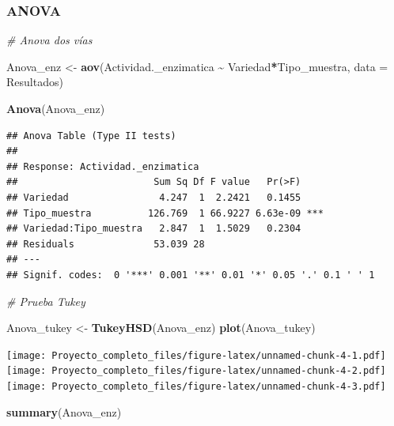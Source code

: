 \documentclass[
]{article}
\newenvironment{Shaded}{\begin{snugshade}}{\end{snugshade}}
\newcommand{\AttributeTok}[1]{\textcolor[rgb]{0.13,0.29,0.53}{#1}}
\newcommand{\CommentTok}[1]{\textcolor[rgb]{0.56,0.35,0.01}{\textit{#1}}}
\newcommand{\FunctionTok}[1]{\textcolor[rgb]{0.13,0.29,0.53}{\textbf{#1}}}
\newcommand{\NormalTok}[1]{#1}
\newcommand{\OtherTok}[1]{\textcolor[rgb]{0.56,0.35,0.01}{#1}}
\newcommand{\SpecialCharTok}[1]{\textcolor[rgb]{0.81,0.36,0.00}{\textbf{#1}}}
\begin{document}
\hypertarget{anova}{%
\subsubsection{\texorpdfstring{\textbf{ANOVA}}{ANOVA}}\label{anova}}

\begin{Shaded}
\begin{Highlighting}[]
\CommentTok{\# Anova dos vías}

\NormalTok{Anova\_enz }\OtherTok{\textless{}{-}} \FunctionTok{aov}\NormalTok{(Actividad.\_enzimatica }\SpecialCharTok{\textasciitilde{}}\NormalTok{ Variedad}\SpecialCharTok{*}\NormalTok{Tipo\_muestra, }\AttributeTok{data =}\NormalTok{ Resultados)}

\FunctionTok{Anova}\NormalTok{(Anova\_enz)}
\end{Highlighting}
\end{Shaded}

\begin{verbatim}
## Anova Table (Type II tests)
## 
## Response: Actividad._enzimatica
##                        Sum Sq Df F value   Pr(>F)    
## Variedad                4.247  1  2.2421   0.1455    
## Tipo_muestra          126.769  1 66.9227 6.63e-09 ***
## Variedad:Tipo_muestra   2.847  1  1.5029   0.2304    
## Residuals              53.039 28                     
## ---
## Signif. codes:  0 '***' 0.001 '**' 0.01 '*' 0.05 '.' 0.1 ' ' 1
\end{verbatim}

\begin{Shaded}
\begin{Highlighting}[]
\CommentTok{\# Prueba Tukey}

\NormalTok{Anova\_tukey }\OtherTok{\textless{}{-}} \FunctionTok{TukeyHSD}\NormalTok{(Anova\_enz)}
\FunctionTok{plot}\NormalTok{(Anova\_tukey)}
\end{Highlighting}
\end{Shaded}

\texttt{[image: Proyecto\_completo\_files/figure-latex/unnamed-chunk-4-1.pdf]}
\texttt{[image: Proyecto\_completo\_files/figure-latex/unnamed-chunk-4-2.pdf]}
\texttt{[image: Proyecto\_completo\_files/figure-latex/unnamed-chunk-4-3.pdf]}

\begin{Shaded}
\begin{Highlighting}[]
\FunctionTok{summary}\NormalTok{(Anova\_enz)}
\end{Highlighting}
\end{Shaded}
\end{document}
